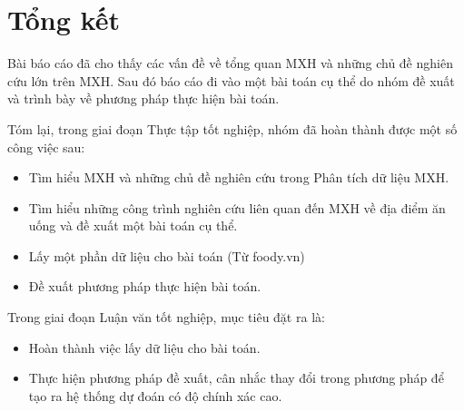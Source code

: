 \documentclass[12pt]{extarticle}
\begin{document}
	\section{Tổng kết}
		\par Bài báo cáo đã cho thấy các vấn đề về tổng quan MXH và những chủ đề nghiên cứu lớn trên MXH. Sau đó báo cáo đi vào một bài toán cụ thể do nhóm đề xuất và trình bày về phương pháp thực hiện bài toán.
		\par Tóm lại, trong giai đoạn Thực tập tốt nghiệp, nhóm đã hoàn thành được một số công việc sau:
		\begin{itemize}
			\item Tìm hiểu MXH và những chủ đề nghiên cứu trong Phân tích dữ liệu MXH.
			\item Tìm hiểu những công trình nghiên cứu liên quan đến MXH về địa điểm ăn uống và đề xuất một bài toán cụ thể. 
			\item Lấy một phần dữ liệu cho bài toán (Từ foody.vn)
			\item Đề xuất phương pháp thực hiện bài toán.
		\end{itemize}

		\par Trong giai đoạn Luận văn tốt nghiệp, mục tiêu đặt ra là:

		\begin{itemize}
			\item Hoàn thành việc lấy dữ liệu cho bài toán.
			\item Thực hiện phương pháp đề xuất, cân nhắc thay đổi trong phương pháp để tạo ra hệ thống dự đoán có độ chính xác cao. 
		\end{itemize}
		\newpage
\end{document}
